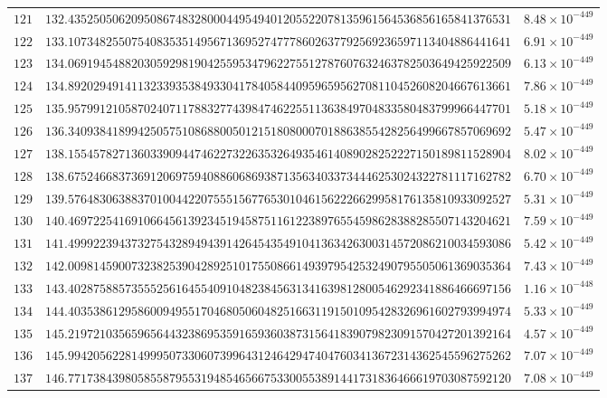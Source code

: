 \documentclass[12pt,reqno]{amsart}
\theoremstyle{remark}
\begin{document}
\begin{longtable}{clc}
$121$ & $132.4352505062095086748328000449549401205522078135961564536856165841376531$ & $8.48\times 10^{-449}$ \\
$122$ & $133.1073482550754083535149567136952747778602637792569236597113404886441641$ & $6.91\times 10^{-449}$ \\
$123$ & $134.0691945488203059298190425595347962275512787607632463782503649425922509$ & $6.13\times 10^{-449}$ \\
$124$ & $134.8920294914113233935384933041784058440959659562708110452608204667613661$ & $7.86\times 10^{-449}$ \\
$125$ & $135.9579912105870240711788327743984746225511363849704833580483799966447701$ & $5.18\times 10^{-449}$ \\
$126$ & $136.3409384189942505751086880050121518080007018863855428256499667857069692$ & $5.47\times 10^{-449}$ \\
$127$ & $138.1554578271360339094474622732263532649354614089028252227150189811528904$ & $8.02\times 10^{-449}$ \\
$128$ & $138.6752466837369120697594088606869387135634033734446253024322781117162782$ & $6.70\times 10^{-449}$ \\
$129$ & $139.5764830638837010044220755515677653010461562226629958176135810933092527$ & $5.31\times 10^{-449}$ \\
$130$ & $140.4697225416910664561392345194587511612238976554598628388285507143204621$ & $7.59\times 10^{-449}$ \\
$131$ & $141.4999223943732754328949439142645435491041363426300314572086210034593086$ & $5.42\times 10^{-449}$ \\
$132$ & $142.0098145900732382539042892510175508661493979542532490795505061369035364$ & $7.43\times 10^{-449}$ \\
$133$ & $143.4028758857355525616455409104823845631341639812800546292341886466697156$ & $1.16\times 10^{-448}$ \\
$134$ & $144.4035386129586009495517046805060482516631191501095428326961602793994974$ & $5.33\times 10^{-449}$ \\
$135$ & $145.2197210356596564432386953591659360387315641839079823091570427201392164$ & $4.57\times 10^{-449}$ \\
$136$ & $145.9942056228149995073306073996431246429474047603413672314362545596275262$ & $7.07\times 10^{-449}$ \\
$137$ & $146.7717384398058558795531948546566753300553891441731836466619703087592120$ & $7.08\times 10^{-449}$ \\

\end{longtable}
\end{document}
